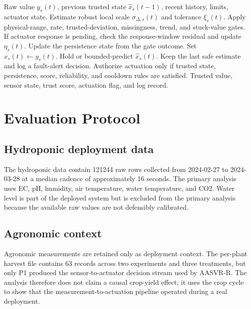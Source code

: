 \documentclass[preprint,12pt,doubleblind]{elsarticle}
\begin{document}
\begin{algorithm}[t]
\caption{Streaming AASVR-R update for one sensor}
\label{alg:aasvr}
\begin{algorithmic}[1]
\REQUIRE Raw value $y_s(t)$, previous trusted state $\hat{x}_s(t-1)$, recent history, limits, actuator state.
\STATE Estimate robust local scale $\sigma_{\Delta,s}(t)$ and tolerance $\xi_s(t)$.
\STATE Apply physical-range, rate, trusted-deviation, missingness, trend, and stuck-value gates.
\STATE If actuator response is pending, check the response-window residual and update $\eta_s(t)$.
\STATE Update the persistence state from the gate outcome.
  \STATE Set $\hat{x}_s(t)\leftarrow y_s(t)$.
  \STATE Hold or bounded-predict $\hat{x}_s(t)$.
\ELSE
  \STATE Keep the last safe estimate and log a fault-alert decision.
\ENDIF
\STATE Authorize actuation only if trusted state, persistence, score, reliability, and cooldown rules are satisfied.
\RETURN Trusted value, sensor state, trust score, actuation flag, and log record.
\end{algorithmic}
\end{algorithm}
\FloatBarrier

\section{Evaluation Protocol}
\subsection{Hydroponic deployment data}
The hydroponic data contain 121244 raw rows collected from 2024-02-27 to 2024-03-28 at a median cadence of approximately 16 seconds. The primary analysis uses EC, pH, humidity, air temperature, water temperature, and CO2. Water level is part of the deployed system but is excluded from the primary analysis because the available raw values are not defensibly calibrated.

\subsection{Agronomic context}
Agronomic measurements are retained only as deployment context. The per-plant harvest file contains 63 records across two experiments and three treatments, but only P1 produced the sensor-to-actuator decision stream used by AASVR-R. The analysis therefore does not claim a causal crop-yield effect; it uses the crop cycle to show that the measurement-to-actuation pipeline operated during a real deployment.
\end{document}
